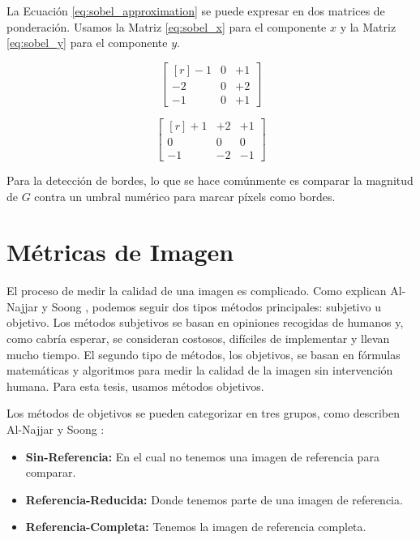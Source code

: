 \documentclass[pregrado]{tesis-usb} %
\begin{document}
La Ecuación \ref{eq:sobel_approximation} se puede expresar en dos matrices de ponderación. Usamos la Matriz \ref{eq:sobel_x} para el componente $x$ y la Matriz \ref{eq:sobel_y} para el componente $y$.

\begin{equation}
\begin{bmatrix*}[r]\label{eq:sobel_x}
-1 &  0 & +1 \\
-2 &  0 & +2 \\
-1 &  0 & +1
\end{bmatrix*}
\end{equation}

\begin{equation}
\begin{bmatrix*}[r]\label{eq:sobel_y}
+1 & +2 & +1 \\
 0 &  0 &  0 \\
-1 & -2 & -1
\end{bmatrix*}
\end{equation}

Para la detección de bordes, lo que se hace comúnmente es comparar la magnitud de $G$ contra un umbral numérico para marcar píxels como bordes.

\section{Métricas de Imagen}
El proceso de medir la calidad de una imagen es complicado. Como explican Al-Najjar y Soong \cite{Yusra2012}, podemos seguir dos tipos métodos principales: subjetivo u objetivo. Los métodos subjetivos se basan en opiniones recogidas de humanos y, como cabría esperar, se consideran costosos, difíciles de implementar y llevan mucho tiempo. El segundo tipo de métodos, los objetivos, se basan en fórmulas matemáticas y algoritmos para medir la calidad de la imagen sin intervención humana. Para esta tesis, usamos métodos objetivos.

Los métodos de objetivos se pueden categorizar en tres grupos, como describen Al-Najjar y Soong \cite{Yusra2012}:

\begin{itemize}
	\item \textbf{Sin-Referencia:} En el cual no tenemos una imagen de referencia para comparar.
	\item \textbf{Referencia-Reducida:} Donde tenemos parte de una imagen de referencia.
	\item \textbf{Referencia-Completa:} Tenemos la imagen de referencia completa.
\end{itemize}
\end{document}
